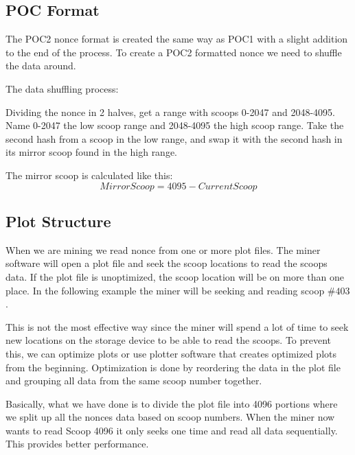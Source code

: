 \subsection{POC Format}
\begin{flushleft}
    The POC2 nonce format is created the same way as POC1 with a slight addition to the end of the process. To create a POC2 formatted nonce we need to shuffle the data around.
\end{flushleft}
\begin{flushleft}
    The data shuffling process:
\end{flushleft}
\begin{flushleft}
    Dividing the nonce in 2 halves, get a range with scoops 0-2047 and 2048-4095. Name 0-2047 the low scoop range and 2048-4095 the high scoop range. Take the second hash from a scoop in the low range, and swap it with the second hash in its mirror scoop found in the high range.
\end{flushleft}
\begin{flushleft}
    The mirror scoop is calculated like this:
    \begin{equation}
        MirrorScoop = 4095 - CurrentScoop
    \end{equation}
\end{flushleft}
\subsection{Plot Structure}
\begin{flushleft}
    When we are mining we read nonce from one or more plot files. The miner software will open a plot file and seek the scoop locations to read the scoops data. If the plot file is unoptimized, the scoop location will be on more than one place. In the following example the miner will be seeking and reading scoop $\#403$.
\end{flushleft}
\begin{flushleft}
    This is not the most effective way since the miner will spend a lot of time to seek new locations on the storage device to be able to read the scoops. To prevent this, we can optimize plots or use plotter software that creates optimized plots from the beginning. Optimization is done by reordering the data in the plot file and grouping all data from the same scoop number together.
\end{flushleft}
\begin{flushleft}
    Basically, what we have done is to divide the plot file into 4096 portions where we split up all the nonces data based on scoop numbers. When the miner now wants to read Scoop 4096 it only seeks one time and read all data sequentially. This provides better performance.
\end{flushleft}
